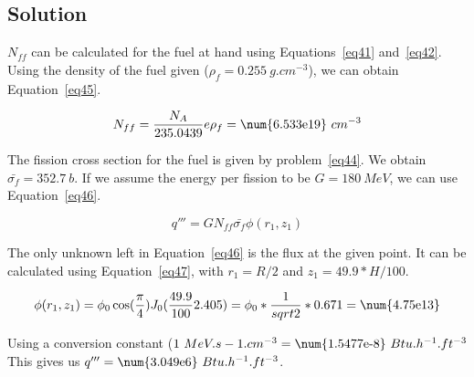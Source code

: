\subsection{Solution}

$N_{ff}$ can be calculated for the fuel at hand using Equations~\ref{eq41} and~\ref{eq42}. Using the density of the fuel given ($\rho_f = 0.255\ g.cm^{-3}$), we can obtain Equation~\ref{eq45}.

\begin{equation}\label{eq45}
N_{ff} = \frac{N_A}{235.0439}e\rho_{f} = \text{\num{6.533e19}}\ cm^{-3}
\end{equation}

The fission cross section for the fuel is given by problem~\ref{eq44}. We obtain $\bar{\sigma_{f}} = 352.7\ b$. If we assume the energy per fission to be $G = 180\ MeV$, we can use Equation~\ref{eq46}.

\begin{equation}\label{eq46}
q''' = G N_{ff} \bar{\sigma_{f}} \phi(r_1, z_1)
\end{equation}

The only unknown left in Equation~\ref{eq46} is the flux at the given point. It can be calculated using Equation~\ref{eq47}, with $r_1 = R/2$ and $z_1 = 49.9*H/100$.

\begin{equation}\label{eq46}
\phi(r_1, z_1) = \phi_0 \cos(\frac{\pi}{4}) J_0(\frac{49.9}{100}2.405) = \phi_0 * \frac{1}{sqrt{2}} * 0.671 = \text{\num{4.75e13}}
\end{equation}

Using a conversion constant ($1\ MeV.s-1.cm^{-3} = \text{\num{1.5477e-8}}\ Btu.h^{-1}.ft^{-3}$This gives us $q''' = \text{\num{3.049e6}}\ Btu.h^{-1}.ft^{-3}$.
